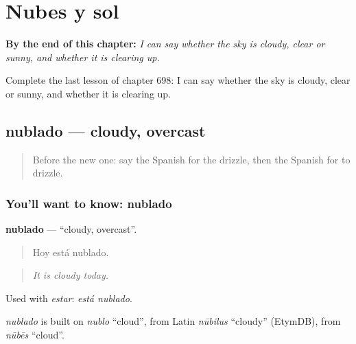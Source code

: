
\chapter{Nubes y sol}
\label{ch:es-nubes-y-sol}

\begin{chapteropening}
\textbf{By the end of this chapter:} \emph{I can say whether the sky is cloudy, clear or sunny, and whether it is clearing up.}

Complete the last lesson of chapter 698: I can say whether the sky is cloudy, clear or sunny, and whether it is clearing up.
\end{chapteropening}

\section[nublado]{nublado — cloudy, overcast}

\label{lesson:ES-C698-nublado}



\begin{quote}
Before the new one: say the Spanish for the drizzle, then the Spanish for to drizzle.
\end{quote}

\subsection*{You'll want to know: nublado}
\textbf{nublado} — \textquotedblleft{}cloudy, overcast\textquotedblright{}.

\begin{quote}
Hoy está nublado.
\end{quote}

\begin{quote}
\emph{It is cloudy today.}
\end{quote}

Used with \emph{estar}: \emph{está nublado}.

\begin{cousinweb}
\emph{nublado} is built on \emph{nublo} \textquotedblleft{}cloud\textquotedblright{}, from Latin \emph{nūbilus} \textquotedblleft{}cloudy\textquotedblright{} (EtymDB), from \emph{nūbēs} \textquotedblleft{}cloud\textquotedblright{}.
\end{cousinweb}

